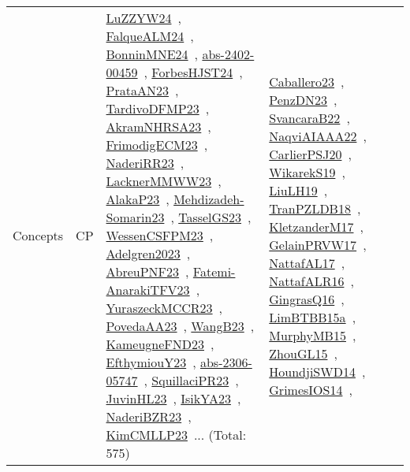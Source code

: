 {\begin{longtable}{lp{3cm}>{\raggedright\arraybackslash}p{6cm}>{\raggedright\arraybackslash}p{6cm}>{\raggedright\arraybackslash}p{8cm}}
\index{CP}\index{Concepts!CP}Concepts & CP & \href{../works/LuZZYW24.pdf}{LuZZYW24}~\cite{LuZZYW24}, \href{../works/FalqueALM24.pdf}{FalqueALM24}~\cite{FalqueALM24}, \href{../works/BonninMNE24.pdf}{BonninMNE24}~\cite{BonninMNE24}, \href{../works/abs-2402-00459.pdf}{abs-2402-00459}~\cite{abs-2402-00459}, \href{../works/ForbesHJST24.pdf}{ForbesHJST24}~\cite{ForbesHJST24}, \href{../works/PrataAN23.pdf}{PrataAN23}~\cite{PrataAN23}, \href{../works/TardivoDFMP23.pdf}{TardivoDFMP23}~\cite{TardivoDFMP23}, \href{../works/AkramNHRSA23.pdf}{AkramNHRSA23}~\cite{AkramNHRSA23}, \href{../works/FrimodigECM23.pdf}{FrimodigECM23}~\cite{FrimodigECM23}, \href{../works/NaderiRR23.pdf}{NaderiRR23}~\cite{NaderiRR23}, \href{../works/LacknerMMWW23.pdf}{LacknerMMWW23}~\cite{LacknerMMWW23}, \href{../works/AlakaP23.pdf}{AlakaP23}~\cite{AlakaP23}, \href{../works/Mehdizadeh-Somarin23.pdf}{Mehdizadeh-Somarin23}~\cite{Mehdizadeh-Somarin23}, \href{../works/TasselGS23.pdf}{TasselGS23}~\cite{TasselGS23}, \href{../works/WessenCSFPM23.pdf}{WessenCSFPM23}~\cite{WessenCSFPM23}, \href{../works/Adelgren2023.pdf}{Adelgren2023}~\cite{Adelgren2023}, \href{../works/AbreuPNF23.pdf}{AbreuPNF23}~\cite{AbreuPNF23}, \href{../works/Fatemi-AnarakiTFV23.pdf}{Fatemi-AnarakiTFV23}~\cite{Fatemi-AnarakiTFV23}, \href{../works/YuraszeckMCCR23.pdf}{YuraszeckMCCR23}~\cite{YuraszeckMCCR23}, \href{../works/PovedaAA23.pdf}{PovedaAA23}~\cite{PovedaAA23}, \href{../works/WangB23.pdf}{WangB23}~\cite{WangB23}, \href{../works/KameugneFND23.pdf}{KameugneFND23}~\cite{KameugneFND23}, \href{../works/EfthymiouY23.pdf}{EfthymiouY23}~\cite{EfthymiouY23}, \href{../works/abs-2306-05747.pdf}{abs-2306-05747}~\cite{abs-2306-05747}, \href{../works/SquillaciPR23.pdf}{SquillaciPR23}~\cite{SquillaciPR23}, \href{../works/JuvinHL23.pdf}{JuvinHL23}~\cite{JuvinHL23}, \href{../works/IsikYA23.pdf}{IsikYA23}~\cite{IsikYA23}, \href{../works/NaderiBZR23.pdf}{NaderiBZR23}~\cite{NaderiBZR23}, \href{../works/KimCMLLP23.pdf}{KimCMLLP23}~\cite{KimCMLLP23}... (Total: 575) & \href{../works/Caballero23.pdf}{Caballero23}~\cite{Caballero23}, \href{../works/PenzDN23.pdf}{PenzDN23}~\cite{PenzDN23}, \href{../works/SvancaraB22.pdf}{SvancaraB22}~\cite{SvancaraB22}, \href{../works/NaqviAIAAA22.pdf}{NaqviAIAAA22}~\cite{NaqviAIAAA22}, \href{../works/CarlierPSJ20.pdf}{CarlierPSJ20}~\cite{CarlierPSJ20}, \href{../works/WikarekS19.pdf}{WikarekS19}~\cite{WikarekS19}, \href{../works/LiuLH19.pdf}{LiuLH19}~\cite{LiuLH19}, \href{../works/TranPZLDB18.pdf}{TranPZLDB18}~\cite{TranPZLDB18}, \href{../works/KletzanderM17.pdf}{KletzanderM17}~\cite{KletzanderM17}, \href{../works/GelainPRVW17.pdf}{GelainPRVW17}~\cite{GelainPRVW17}, \href{../works/NattafAL17.pdf}{NattafAL17}~\cite{NattafAL17}, \href{../works/NattafALR16.pdf}{NattafALR16}~\cite{NattafALR16}, \href{../works/GingrasQ16.pdf}{GingrasQ16}~\cite{GingrasQ16}, \href{../works/LimBTBB15a.pdf}{LimBTBB15a}~\cite{LimBTBB15a}, \href{../works/MurphyMB15.pdf}{MurphyMB15}~\cite{MurphyMB15}, \href{../works/ZhouGL15.pdf}{ZhouGL15}~\cite{ZhouGL15}, \href{../works/HoundjiSWD14.pdf}{HoundjiSWD14}~\cite{HoundjiSWD14}, \href{../works/GrimesIOS14.pdf}{GrimesIOS14}~\cite{GrimesIOS14}, 
\end{longtable}}
